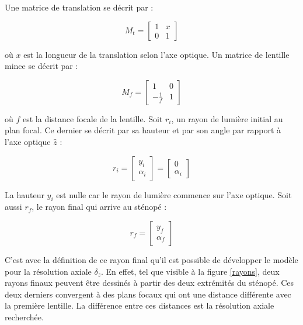 \documentclass[11pt,letterpaper]{article}
\begin{document}
Une matrice de translation se décrit par :

\begin{equation}
  M_{t}= 
  \begin{bmatrix}
    1 & x \\
    0 & 1
  \end{bmatrix}
\end{equation}

où $x$ est la longueur de la translation selon l'axe optique. Un matrice de lentille mince se décrit par :

\begin{equation}
  M_{f} = 
  \begin{bmatrix}
    1 & 0 \\
    -\frac{1}{f} & 1
  \end{bmatrix}
\end{equation}

où $f$ est la distance focale de la lentille. Soit $r_i$, un rayon de lumière initial au plan focal. 
Ce dernier se décrit par sa hauteur et par son angle par rapport à l'axe optique $\hat{z}$ :

\begin{equation}
  r_{i}= 
  \begin{bmatrix}
    y_{i} \\
    \alpha_{i}
  \end{bmatrix}= 
  \begin{bmatrix}
    0 \\
    \alpha_{i}
  \end{bmatrix}
\end{equation}

La hauteur $y_{i}$ est nulle car le rayon de lumière commence sur l'axe optique. Soit aussi $r_{f}$,
le rayon final qui arrive au sténopé :

\begin{equation}
  r_{f}= 
  \begin{bmatrix}
    y_{f} \\
    \alpha_{f}
  \end{bmatrix}
\end{equation}

C'est avec la définition de ce rayon final qu'il est possible de développer le modèle pour la résolution
axiale $\delta_{z}$. En effet, tel que visible à la figure \ref{rayons}, deux rayons finaux peuvent
être dessinés à partir des deux extrémités du sténopé. Ces deux derniers convergent à des plans focaux
qui ont une distance différente avec la première lentille. La différence entre ces distances est la
résolution axiale recherchée.
\end{document}
